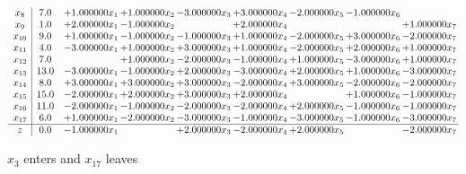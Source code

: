 \documentclass[10pt]{article}
\begin{document}
\[\begin{array}{c| c c@{\hskip 2pt} c@{\hskip 2pt} c@{\hskip 2pt} c@{\hskip 2pt} c@{\hskip 2pt} c@{\hskip 2pt} c@{\hskip 2pt} }
 x_{8}   &  7.0 & + 1.000000 x_{1} & + 1.000000 x_{2} & -3.000000 x_{3} & + 3.000000 x_{4} & -2.000000 x_{5} & -1.000000 x_{6} &   \\
 x_{9}   &  1.0 & + 2.000000 x_{1} & -1.000000 x_{2} &   & + 2.000000 x_{4} &    &   & + 1.000000 x_{7}\\
 x_{10}   &  9.0 & + 1.000000 x_{1} & -1.000000 x_{2} & -1.000000 x_{3} & + 1.000000 x_{4} & -2.000000 x_{5} & + 3.000000 x_{6} & -2.000000 x_{7}\\
 x_{11}   &  4.0 & -3.000000 x_{1} & + 1.000000 x_{2} & + 3.000000 x_{3} & + 1.000000 x_{4} & -2.000000 x_{5} & + 2.000000 x_{6} & + 1.000000 x_{7}\\
 x_{12}   &  7.0  &   & + 1.000000 x_{2} & -2.000000 x_{3} & -1.000000 x_{4} & + 1.000000 x_{5} & -3.000000 x_{6} & + 1.000000 x_{7}\\
 x_{13}   &  13.0 & -3.000000 x_{1} & -1.000000 x_{2} & + 2.000000 x_{3} & -3.000000 x_{4} & + 2.000000 x_{5} & + 1.000000 x_{6} & -3.000000 x_{7}\\
 x_{14}   &  8.0 & + 3.000000 x_{1} & + 3.000000 x_{2} & + 3.000000 x_{3} & -2.000000 x_{4} & + 3.000000 x_{5} & -2.000000 x_{6} & -2.000000 x_{7}\\
 x_{15}   &  15.0 & -2.000000 x_{1} & + 2.000000 x_{2} & + 3.000000 x_{3} & + 2.000000 x_{4} &   & + 1.000000 x_{6} & -1.000000 x_{7}\\
 x_{16}   &  11.0 & -2.000000 x_{1} & -1.000000 x_{2} & -2.000000 x_{3} & -2.000000 x_{4} & + 2.000000 x_{5} & -1.000000 x_{6} & -1.000000 x_{7}\\
 x_{17}   &  6.0 & + 1.000000 x_{1} & -2.000000 x_{2} & -3.000000 x_{3} & -1.000000 x_{4} & -3.000000 x_{5} & -1.000000 x_{6} & -3.000000 x_{7}\\
\hline
z    &  0.0 & -1.000000 x_{1} &   & + 2.000000 x_{3} & -2.000000 x_{4} & + 2.000000 x_{5} &   & -2.000000 x_{7}\\
\end{array}\]


 $ x_{3} $ enters and $ x_{17} $ leaves 
\end{document}
